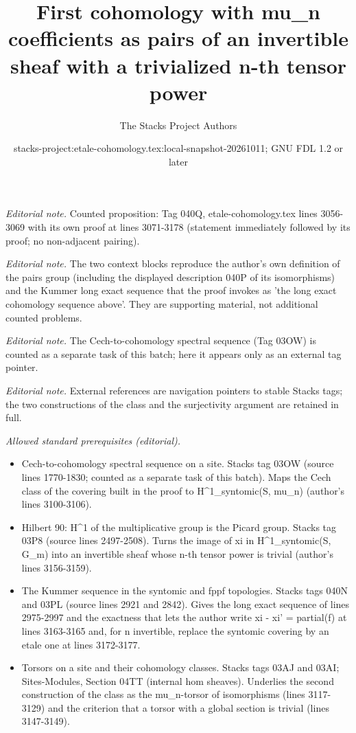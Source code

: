 \documentclass[10pt,a4paper]{amsart}
\title{First cohomology with mu\_n coefficients as pairs of an invertible sheaf with a trivialized n-th tensor power}
\author{The Stacks Project Authors}
\date{stacks-project:etale-cohomology.tex:local-snapshot-20261011; GNU FDL 1.2 or later}
\theoremstyle{plain}
\theoremstyle{definition}
\theoremstyle{remark}
\numberwithin{equation}{subsection}
\begin{document}
\maketitle
\noindent\textit{Editorial note.} Counted proposition: Tag 040Q, etale-cohomology.tex lines 3056-3069 with its own proof at lines 3071-3178 (statement immediately followed by its proof; no non-adjacent pairing).\par\medskip
\noindent\textit{Editorial note.} The two context blocks reproduce the author's own definition of the pairs group (including the displayed description 040P of its isomorphisms) and the Kummer long exact sequence that the proof invokes as 'the long exact cohomology sequence above'. They are supporting material, not additional counted problems.\par\medskip
\noindent\textit{Editorial note.} The Cech-to-cohomology spectral sequence (Tag 03OW) is counted as a separate task of this batch; here it appears only as an external tag pointer.\par\medskip
\noindent\textit{Editorial note.} External references are navigation pointers to stable Stacks tags; the two constructions of the class and the surjectivity argument are retained in full.\par\medskip
\noindent\textit{Allowed standard prerequisites (editorial).}\begin{itemize}
\item Cech-to-cohomology spectral sequence on a site. Stacks tag 03OW (source lines 1770-1830; counted as a separate task of this batch). Maps the Cech class of the covering built in the proof to H\textasciicircum{}1\_syntomic(S, mu\_n) (author's lines 3100-3106).
\item Hilbert 90: H\textasciicircum{}1 of the multiplicative group is the Picard group. Stacks tag 03P8 (source lines 2497-2508). Turns the image of xi in H\textasciicircum{}1\_syntomic(S, G\_m) into an invertible sheaf whose n-th tensor power is trivial (author's lines 3156-3159).
\item The Kummer sequence in the syntomic and fppf topologies. Stacks tags 040N and 03PL (source lines 2921 and 2842). Gives the long exact sequence of lines 2975-2997 and the exactness that lets the author write xi - xi' = partial(f) at lines 3163-3165 and, for n invertible, replace the syntomic covering by an etale one at lines 3172-3177.
\item Torsors on a site and their cohomology classes. Stacks tags 03AJ and 03AI; Sites-Modules, Section 04TT (internal hom sheaves). Underlies the second construction of the class as the mu\_n-torsor of isomorphisms (lines 3117-3129) and the criterion that a torsor with a global section is trivial (lines 3147-3149).
\end{itemize}\medskip
\end{document}
